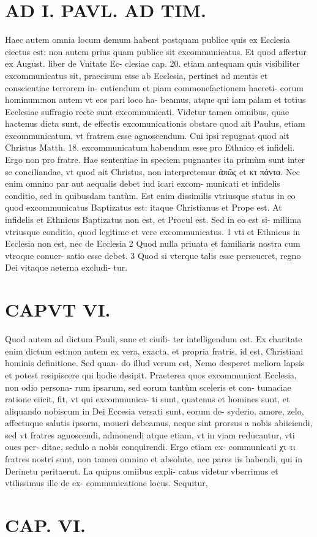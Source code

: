 \documentclass{article}
\begin{document}
\begin{pages}
\section*{AD I. PAVL. AD TIM. }
\marginpar{[ p.Feu. ]}\pstart Haec autem omnia locum demum habent postquam publice quis ex Ecclesia eiectus est: non autem prius quam publice sit excommunicatus. Et quod affertur ex August. liber  de Vnitate Ec- clesiae cap. 20. etiam antequam quis visibiliter excommunicatus sit, praecisum esse ab Ecclesia, pertinet ad mentis et conscientiae terrorem in- cutiendum et piam commonefactionem haereti- corum hominum:non autem vt eos pari loco ha- beamus, atque qui iam palam et totius Ecclesiae suffragio recte sunt excommunicati.  \pend\pstart Videtur tamen omnibus, quae hactenus dicta sunt, de effectis excomunicationis obstare quod ait Paulus, etiam excommunicatum, vt fratrem esse agnoscendum. Cui ipsi repugnat quod ait Christus Matth. 18. excommunicatum habendum esse pro Ethnico et infideli. Ergo non pro fratre. Hae sententiae in speciem pugnantes ita primùm sunt inter se conciliandae, vt quod ait Christus, non interpretemur ἀπῶς et κτ πάντα. Nec enim omnino par aut aequalis debet iud icari excom- municati et infidelis conditio, sed in quibusdam tantùm. Est enim dissimilis vtriusque status in eo quod excommunicatus Baptizatus est: itaque Christianus et Prope est. At infidelis et Ethnicus Baptizatus non est, et Procul est. Sed in eo est si- millima vtriusque conditio, quod legitime et vere excommunicatus. 1 vti et Ethnicus in Ecclesia non est, nec de Ecclesia 2 Quod nulla priuata et familiaris nostra cum vtroque conuer- satio esse debet. 3 Quod si vterque talis esse perseueret, regno Dei vitaque aeterna excludi- tur.  \pend
\section*{CAPVT VI. }
\marginpar{[ p.409 ]}\pstart Quod autem ad dictum Pauli, sane et ciuili- ter intelligendum est. Ex charitate enim dictum est:non autem ex vera, exacta, et propria fratris, id est, Christiani hominis definitione. Sed quan- do illud verum est, Nemo desperet meliora lapsis et potest resipiscere qui hodie desipit. Praeterea quos excommunicat Ecclesia, non odio persona- rum ipsarum, sed eorum tantùm sceleris et con- tumaciae ratione eiicit, fit, vt qui excommunica- ti sunt, quatenus et homines sunt, et aliquando nobiscum in Dei Eccesia versati sunt, eorum de- syderio, amore, zelo, affectuque salutis ipsorm, moueri debeamus, neque sint prorsus a nobis abiiciendi, sed vt fratres agnoscendi, admonendi atque etiam, vt in viam reducantur, vti oues per- ditae, sedulo a nobis conquirendi. Ergo etiam ex- communicati χτ τι fratres nostri sunt, non tamen omnino et absolute, nec pares iis habendi, qui in Derinetu peritaerut. La quipus omiibus expli- catus videtur vberrimus et vtilissimus ille de ex- communicatione locus. Sequitur,  \pend
\endnumbering\beginnumbering\section{CAP. VI.}
{}

\end{pages}
\end{document}
